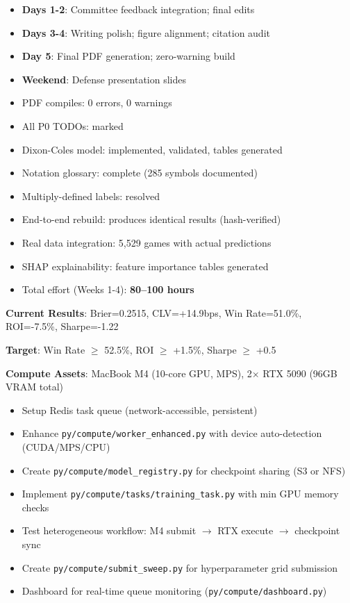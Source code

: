 \begin{itemize}
  \item \textbf{Days 1-2}: Committee feedback integration; final edits
  \item \textbf{Days 3-4}: Writing polish; figure alignment; citation audit
  \item \textbf{Day 5}: Final PDF generation; zero-warning build
  \item \textbf{Weekend}: Defense presentation slides
\end{itemize}

\begin{itemize}
  \item PDF compiles: 0 errors, 0 warnings \done
  \item All P0 TODOs: marked \done
  \item Dixon-Coles model: implemented, validated, tables generated \done
  \item Notation glossary: complete (285 symbols documented) \done
  \item Multiply-defined labels: resolved \done
  \item End-to-end rebuild: produces identical results (hash-verified)
  \item Real data integration: 5,529 games with actual predictions \done
  \item SHAP explainability: feature importance tables generated \done
  \item Total effort (Weeks 1-4): \textbf{80--100 hours} \done
\end{itemize}


\textbf{Current Results}: Brier=0.2515, CLV=+14.9bps, Win Rate=51.0\%, ROI=-7.5\%, Sharpe=-1.22

\textbf{Target}: Win Rate $\ge$ 52.5\%, ROI $\ge$ +1.5\%, Sharpe $\ge$ +0.5

\textbf{Compute Assets}: MacBook M4 (10-core GPU, MPS), 2$\times$ RTX 5090 (96GB VRAM total)

\begin{itemize}
  \item {} Setup Redis task queue (network-accessible, persistent)
  \item {} Enhance \texttt{py/compute/worker\_enhanced.py} with device auto-detection (CUDA/MPS/CPU)
  \item {} Create \texttt{py/compute/model\_registry.py} for checkpoint sharing (S3 or NFS)
  \item {} Implement \texttt{py/compute/tasks/training\_task.py} with min GPU memory checks
  \item {} Test heterogeneous workflow: M4 submit $\to$ RTX execute $\to$ checkpoint sync
  \item {} Create \texttt{py/compute/submit\_sweep.py} for hyperparameter grid submission
  \item {} Dashboard for real-time queue monitoring (\texttt{py/compute/dashboard.py})
\end{itemize}

